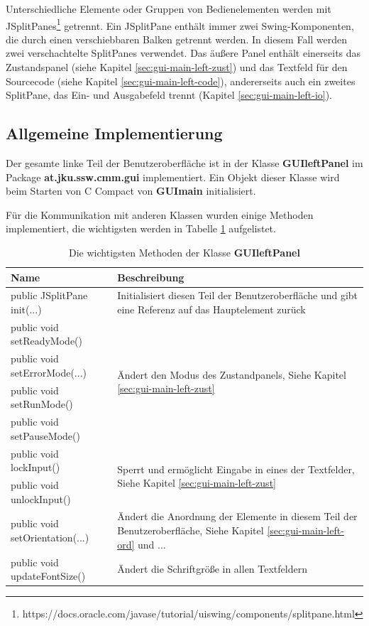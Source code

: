 Unterschiedliche Elemente oder Gruppen von Bedienelementen werden mit JSplitPanes\footnote{https://docs.oracle.com/javase/tutorial/uiswing/components/splitpane.html} getrennt. Ein JSplitPane enthält immer zwei Swing-Komponenten, die durch einen verschiebbaren Balken getrennt werden. In diesem Fall werden zwei verschachtelte SplitPanes verwendet. Das äußere Panel enthält einerseits das Zustandspanel (siehe Kapitel \ref{sec:gui-main-left-zust}) und das Textfeld für den Sourcecode (siehe Kapitel \ref{sec:gui-main-left-code}), andererseits auch ein zweites SplitPane, das Ein- und Ausgabefeld trennt (Kapitel \ref{sec:gui-main-left-io}).

\subsection{Allgemeine Implementierung}
Der gesamte linke Teil der Benutzeroberfläche ist in der Klasse \textbf{GUIleftPanel} im Package \textbf{at.jku.ssw.cmm.gui} implementiert. Ein Objekt dieser Klasse wird beim Starten von C Compact von \textbf{GUImain} initialisiert.

Für die Kommunikation mit anderen Klassen wurden einige Methoden implementiert, die wichtigsten werden in Tabelle \ref{tab:gui-main-left-methods} aufgelistet.

\def\arraystretch{1.6}
\begin{table}[h!]
\begin{tabular}{|l|p{9cm}|}
\hline
\textbf{Name}&\textbf{Beschreibung}\\
\hline
\hline
public JSplitPane init(...)&Initialisiert diesen Teil der Benutzeroberfläche und gibt eine Referenz auf das Hauptelement zurück\\
\hline
public void setReadyMode()&\multirow{4}{*}{\parbox{9cm}{Ändert den Modus des Zustandpanels, Siehe Kapitel \ref{sec:gui-main-left-zust}}}\\
public void setErrorMode(...)&\\
public void setRunMode()&\\
public void setPauseMode()&\\
\hline
public void lockInput()&\multirow{2}{*}{\parbox{9cm}{Sperrt und ermöglicht Eingabe in eines der Textfelder, Siehe Kapitel \ref{sec:gui-main-left-zust}}}\\
public void unlockInput()&\\
\hline
public void setOrientation(...)&Ändert die Anordnung der Elemente in diesem Teil der Benutzeroberfläche, Siehe Kapitel \ref{sec:gui-main-left-ord} und ...\\
\hline
public void updateFontSize()&Ändert die Schriftgröße in allen Textfeldern\\
\hline
\end{tabular}
\caption{Die wichtigsten Methoden der Klasse \textbf{GUIleftPanel}}
\label{tab:gui-main-left-methods}
\end{table}

